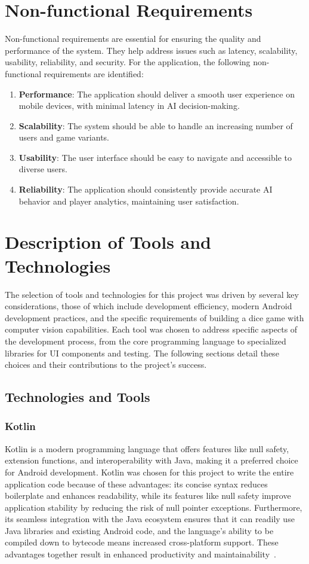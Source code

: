 \section{Non-functional Requirements}
Non-functional requirements are essential for ensuring the quality and performance of the system. They help address issues such as latency, scalability, usability, reliability, and security. For the application, the following non-functional requirements are identified:
\begin{enumerate}
\item {\bfseries Performance}: The application should deliver a smooth user experience on mobile devices, with minimal latency in AI decision-making.
\item {\bfseries Scalability}: The system should be able to handle an increasing number of users and game variants.
\item {\bfseries Usability}: The user interface should be easy to navigate and accessible to diverse users.
\item {\bfseries Reliability}: The application should consistently provide accurate AI behavior and player analytics, maintaining user satisfaction.
\end{enumerate}


\section{Description of Tools and Technologies}
The selection of tools and technologies for this project was driven by several key considerations, those of which include development efficiency, modern Android development practices, and the specific requirements of building a dice game with computer vision capabilities. Each tool was chosen to address specific aspects of the development process, from the core programming language to specialized libraries for UI components and testing. The following sections detail these choices and their contributions to the project's success.

\subsection{Technologies and Tools}

\subsubsection{Kotlin}
\label{sec:kotlin}
Kotlin is a modern programming language that offers features like null safety, extension functions, and interoperability with Java, making it a preferred choice for Android development. Kotlin was chosen for this project to write the entire application code because of these advantages: its concise syntax reduces boilerplate and enhances readability, while its features like null safety improve application stability by reducing the risk of null pointer exceptions. Furthermore, its seamless integration with the Java ecosystem ensures that it can readily use Java libraries and existing Android code, and the language's ability to be compiled down to bytecode means increased cross-platform support. These advantages together result in enhanced productivity and maintainability~\cite{bib:kotlin}.


